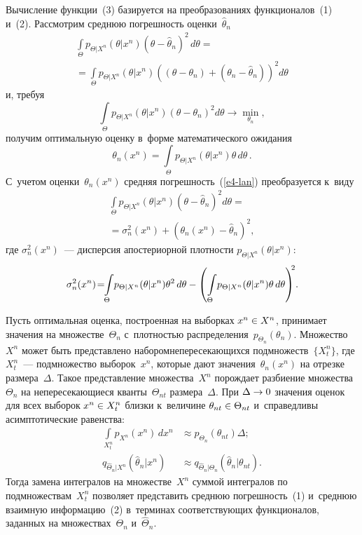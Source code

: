\begin{multicols}{2}
Вычисление функции~(3) базируется на преобразованиях функционалов~(1) и~(2). Рассмотрим 
сред\-нюю по\-греш\-ность оценки~$\hat{\theta}_n$ 
\begin{multline}
\int\limits_\Theta p_{\Theta\vert X^n} (\theta\vert x^n) \left(\theta- \hat{\theta}_n\right)^2\,d\theta = {}\\
{}=
\int\limits_{\Theta} p_{\Theta\vert X^n} (\theta\vert x^n) \left( \left(\theta-\theta_n\right) +\left(\theta_n-
\hat{\theta}_n\right)\right)^2 d\theta
\label{e4-lan}
\end{multline}
и, требуя 
$$
\int\limits_\Theta p_{\Theta\vert X^n} \left(\theta\vert x^n\right) \left(\theta- \theta_n\right)^2d\theta 
\to \min\limits_{\theta_n},
$$
 получим оптимальную оценку в~форме математического 
ожидания 
$$
\theta_n(x^n) = \int\limits_{\Theta}  p_{\Theta\vert X^n} (\theta\vert x^n)\theta\,d\theta\,.
$$
%
 С~учетом оценки~$\theta_n(x^n)$ средняя 
погрешность~(\ref{e4-lan}) преобразуется к~виду 
\begin{multline}
\int\limits_{\Theta} p_{\Theta\vert X^n} (\theta\vert x^n) \left(\theta-\hat{\theta}_n\right)^2d\theta 
={}\\
{}=\sigma_n^2(x^n) +\left( \theta_n(x^n) -\hat{\theta}_n\right)^2\!,
\label{e5-lan}
\end{multline}
где $\sigma_n^2(x^n)$~--- дисперсия апостериорной плотности $p_{\Theta\vert X^n} (\theta\vert x^n)$:
$$
\sigma_n^2(x^n) \!=\!\! \int\limits_{\Theta} \!p_{\Theta\vert X^n} (\theta\vert 
x^n)\theta^2\,d\theta - \left( \int\limits_{\Theta}\! p_{\Theta\vert X^n} (\theta\vert 
x^n)\theta\,d\theta\right)^{\!\!2}\!.\hspace*{-0.65227pt}
$$ 

Пусть оптимальная оценка, построенная на выборках $x^n\hm\in X^n$, принимает значения на 
множестве~$\Theta_n$ с~плот\-ностью распределения~$p_{\Theta_n} (\theta_n)$. 
Множество~$X^n$ может быть пред\-став\-ле\-но набором\linebreak не\-пе\-ре\-се\-ка\-ющих\-ся подмножеств~$\{ 
X^n_t\}$, где $X_t^n$~--- подмножество выборок~$x^n$, которые дают 
значения~$\theta_n(x^n)$ на отрезке размера~$\Delta$. Такое пред\-став\-ле\-ние множества~$X^n$ 
по\-рож\-да\-ет разбиение \mbox{множества}~$\Theta_n$ на непересекающиеся кван\-ты~$\Theta_{nt}$ 
размера~$\Delta$. При $\Delta\hm\to 0$ значения оценок для всех выборок $x^n\hm\in X^n_t$ 
близки к~величине $\theta_{nt}\hm\in \Theta_{nt}$ и~справедливы асимптотические равенства:
\begin{align*}
\int\limits_{X^n_t} p_{X^n} (x^n)\,dx^n &\approx p_{\Theta_n}(\theta_{nt})\Delta; \\  
q_{\hat{\Theta}_n\vert X^n} \left(\hat{\theta}_n\vert x^n\right)&\approx q_{\hat{\Theta}_n\vert 
\Theta_n}\left(\hat{\theta}_n\vert \theta_{nt}\right).
\end{align*}
 Тогда замена интегралов на множестве~$X^n$ суммой 
интегралов по подмножествам~$X_t^n$ поз\-во\-ля\-ет представить сред\-нюю по\-греш\-ность~(1) 
и~среднюю взаимную информацию~(2) в~терминах со\-от\-вет\-ст\-ву\-ющих функционалов, заданных 
на множествах~$\Theta_n$ и~$\hat{\Theta}_n$.


\end{multicols}

